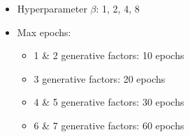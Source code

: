 \begin{itemize}
            \item Hyperparameter $\beta$: 1, 2, 4, 8
            
            \item Max epochs:
            \begin{itemize}
                \item 1 \& 2 generative factors: 10 epochs
                \item 3 generative factors: 20 epochs
                \item 4 \& 5 generative factors: 30 epochs
                \item 6 \& 7 generative factors: 60 epochs
            \end{itemize}
            
        \end{itemize}